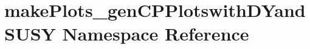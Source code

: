 \hypertarget{namespacemakePlots__genCPPlotswithDYandSUSY}{
\section{makePlots\_\-genCPPlotswithDYandSUSY Namespace Reference}
\label{namespacemakePlots__genCPPlotswithDYandSUSY}
}
